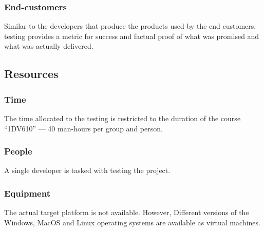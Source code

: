 \subsubsection{End-customers}
Similar to the developers that produce the products used by the end customers,
testing provides a metric for success and factual proof of what was promised
and what was actually delivered.


\subsection{Resources}
\subsubsection{Time}
The time allocated to the testing is restricted to the duration of the course
``1DV610'' --- 40 man-hours per group and person.


\subsubsection{People}
A single developer is tasked with testing the project. 


\subsubsection{Equipment}
The actual target platform is not available. However, Different versions of the
Windows, MacOS and Linux operating systems are available as virtual machines.
